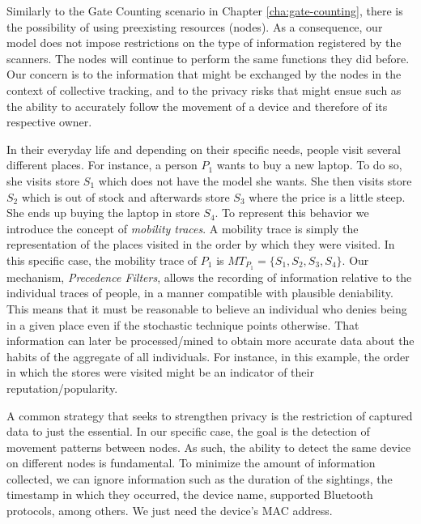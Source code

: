 Similarly to the Gate Counting scenario in Chapter
\ref{cha:gate-counting}, there is the possibility of using preexisting
resources (nodes). As a consequence, our model does not impose
restrictions on the type of information registered by the
scanners. The nodes will continue to perform the same functions they
did before. Our concern is to the information that
might be exchanged by the nodes in the context of collective tracking,
 and to the privacy risks that might ensue such as the ability
to accurately follow the movement of a device and therefore of its
respective owner.

In their everyday life and depending on their specific needs, people
visit several different places. For instance, a person $P_1$ wants to
buy a new laptop. To do so, she visits store $S_1$ which does not have
the model she wants. She then visits store $S_2$ which is out of
stock and afterwards store $S_3$ where the price is a little
steep. She ends up buying the laptop in store $S_4$. To represent this
behavior we introduce the concept of \emph{mobility traces}. A
mobility trace is simply the representation of the places visited in the
order by which they were visited. In this specific case, the mobility
trace of $P_1$ is $MT_{P_1}=\{S_1,S_2,S_3,S_4\}$. Our mechanism,
\emph{Precedence Filters}, allows the recording of information
relative to the individual traces of people, in a manner compatible
with plausible deniability. This means that it must be
reasonable to believe an individual who denies being in a given place
even if the stochastic technique points otherwise. That information can later be
processed/mined to obtain more accurate data about the habits of the
aggregate of all individuals. For instance, in this example, the order
in which the stores were visited might be an indicator of their
reputation/popularity.

A common strategy that seeks to strengthen privacy is the restriction
of captured data to just the essential. In our specific case, the goal
is the detection of movement patterns between nodes. As such, the
ability to detect the same device on different nodes is fundamental. To
minimize the amount of information collected, we can ignore
information such as the duration of the sightings, the timestamp in which
they occurred, the device name, supported Bluetooth protocols,
among others. We just need the device's MAC address.

